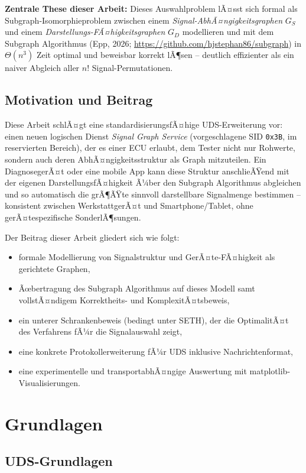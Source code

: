 ﻿\documentclass[a4paper,12pt]{article}
\theoremstyle{definition}
\begin{document}
\textbf{Zentrale These dieser Arbeit:} Dieses Auswahlproblem lÃ¤sst sich formal als Subgraph-Isomorphieproblem zwischen einem \emph{Signal-AbhÃ¤ngigkeitsgraphen} $G_S$ und einem \emph{Darstellungs-FÃ¤higkeitsgraphen} $G_D$ modellieren und mit dem Subgraph Algorithmus (Epp, 2026; \url{https://github.com/hjstephan86/subgraph}) in $\Theta(n^3)$ Zeit optimal und beweisbar korrekt lÃ¶sen -- deutlich effizienter als ein naiver Abgleich aller $n!$ Signal-Permutationen.

\subsection{Motivation und Beitrag}

Diese Arbeit schlÃ¤gt eine standardisierungsfÃ¤hige UDS-Erweiterung vor: einen neuen logischen Dienst \emph{Signal Graph Service} (vorgeschlagene SID \texttt{0x3B}, im reservierten Bereich), der es einer ECU erlaubt, dem Tester nicht nur Rohwerte, sondern auch deren AbhÃ¤ngigkeitsstruktur als Graph mitzuteilen. Ein DiagnosegerÃ¤t oder eine mobile App kann diese Struktur anschlieÃŸend mit der eigenen DarstellungsfÃ¤higkeit Ã¼ber den Subgraph Algorithmus abgleichen und so automatisch die grÃ¶ÃŸte sinnvoll darstellbare Signalmenge bestimmen -- konsistent zwischen WerkstattgerÃ¤t und Smartphone/Tablet, ohne gerÃ¤tespezifische SonderlÃ¶sungen.

Der Beitrag dieser Arbeit gliedert sich wie folgt:
\begin{itemize}
	\item formale Modellierung von Signalstruktur und GerÃ¤te-FÃ¤higkeit als gerichtete Graphen,
	\item Ãœbertragung des Subgraph Algorithmus auf dieses Modell samt vollstÃ¤ndigem Korrektheits- und KomplexitÃ¤tsbeweis,
	\item ein unterer Schrankenbeweis (bedingt unter SETH), der die OptimalitÃ¤t des Verfahrens fÃ¼r die Signalauswahl zeigt,
	\item eine konkrete Protokollerweiterung fÃ¼r UDS inklusive Nachrichtenformat,
	\item eine experimentelle und transportabhÃ¤ngige Auswertung mit matplotlib-Visualisierungen.
\end{itemize}

\section{Grundlagen}

\subsection{UDS-Grundlagen}
\end{document}
